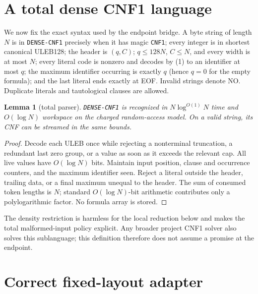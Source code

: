 \documentclass[11pt]{article}
\newtheorem{lemma}[theorem]{Lemma}
\begin{document}
\section{A total dense CNF1 language}

We now fix the exact syntax used by the endpoint bridge.  A byte string of
length $N$ is in \texttt{DENSE-CNF1} precisely when it has magic
\texttt{CNF1}; every integer is in shortest canonical ULEB128; the header is
$(q,C)$; $q\le128N$, $C\le N$, and every width is at most $N$; every literal
code is nonzero and decodes by (1) to an identifier at most $q$; the maximum
identifier occurring is exactly $q$ (hence $q=0$ for the empty formula); and
the last literal ends exactly at EOF.  Invalid strings denote NO.  Duplicate
literals and tautological clauses are allowed.

\begin{lemma}[total parser]\label{lem:parser}
\texttt{DENSE-CNF1} is recognized in $N\log^{O(1)}N$ time and $O(\log N)$
workspace on the charged random-access model.  On a valid string, its CNF can
be streamed in the same bounds.
\end{lemma}
\begin{proof}
Decode each ULEB once while rejecting a nonterminal truncation, a redundant
last zero group, or a value as soon as it exceeds the relevant cap.  All live
values have $O(\log N)$ bits.  Maintain input position, clause and occurrence
counters, and the maximum identifier seen.  Reject a literal outside the
header, trailing data, or a final maximum unequal to the header.  The sum of
consumed token lengths is $N$; standard $O(\log N)$-bit arithmetic contributes
only a polylogarithmic factor.  No formula array is stored.
\end{proof}

The density restriction is harmless for the local reduction below and makes
the total malformed-input policy explicit.  Any broader project CNF1 solver
also solves this sublanguage; this definition therefore does not assume a
promise at the endpoint.

\section{Correct fixed-layout adapter}
\end{document}
